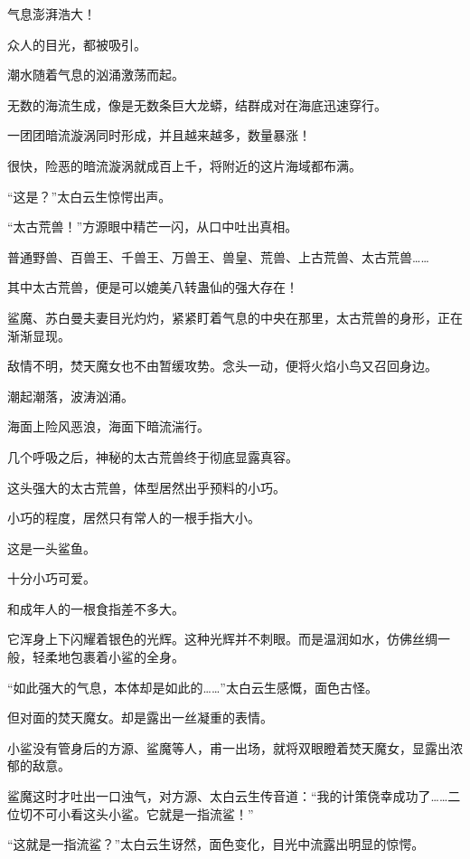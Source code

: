 
\begin{this_body}

气息澎湃浩大！

众人的目光，都被吸引。

潮水随着气息的汹涌激荡而起。

无数的海流生成，像是无数条巨大龙蟒，结群成对在海底迅速穿行。

一团团暗流漩涡同时形成，并且越来越多，数量暴涨！

很快，险恶的暗流漩涡就成百上千，将附近的这片海域都布满。

“这是？”太白云生惊愕出声。

“太古荒兽！”方源眼中精芒一闪，从口中吐出真相。

普通野兽、百兽王、千兽王、万兽王、兽皇、荒兽、上古荒兽、太古荒兽……

其中太古荒兽，便是可以媲美八转蛊仙的强大存在！

鲨魔、苏白曼夫妻目光灼灼，紧紧盯着气息的中央在那里，太古荒兽的身形，正在渐渐显现。

敌情不明，焚天魔女也不由暂缓攻势。念头一动，便将火焰小鸟又召回身边。

潮起潮落，波涛汹涌。

海面上险风恶浪，海面下暗流湍行。

几个呼吸之后，神秘的太古荒兽终于彻底显露真容。

这头强大的太古荒兽，体型居然出乎预料的小巧。

小巧的程度，居然只有常人的一根手指大小。

这是一头鲨鱼。

十分小巧可爱。

和成年人的一根食指差不多大。

它浑身上下闪耀着银色的光辉。这种光辉并不刺眼。而是温润如水，仿佛丝绸一般，轻柔地包裹着小鲨的全身。

“如此强大的气息，本体却是如此的……”太白云生感慨，面色古怪。

但对面的焚天魔女。却是露出一丝凝重的表情。

小鲨没有管身后的方源、鲨魔等人，甫一出场，就将双眼瞪着焚天魔女，显露出浓郁的敌意。

鲨魔这时才吐出一口浊气，对方源、太白云生传音道：“我的计策侥幸成功了……二位切不可小看这头小鲨。它就是一指流鲨！”

“这就是一指流鲨？”太白云生讶然，面色变化，目光中流露出明显的惊愕。


\end{this_body}
